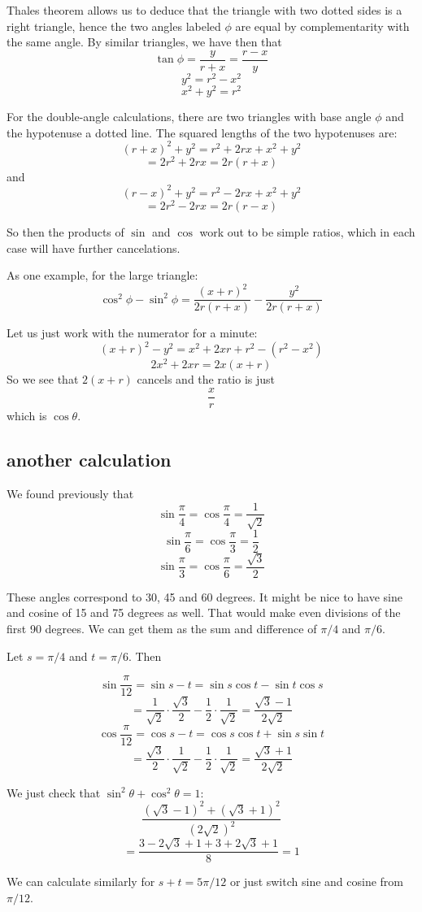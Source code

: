 \documentclass[11pt, oneside]{article}
\begin{document}
Thales theorem allows us to deduce that the triangle with two dotted sides is a right triangle, hence the two angles labeled $\phi$ are equal by complementarity with the same angle.  By similar triangles, we have then that
\[ \tan \phi = \frac{y}{r + x} = \frac{r - x}{y} \]
\[ y^2 = r^2 - x^2 \]
\[ x^2 + y^2 = r^2 \]

For the double-angle calculations, there are two triangles with base angle $\phi$ and the hypotenuse a dotted line.  The squared lengths of the two hypotenuses are:
\[ (r + x)^2 + y^2 = r^2 + 2rx + x^2 + y^2 \]
\[ = 2r^2 + 2rx = 2r(r + x) \]
and 
\[ (r - x)^2 + y^2 = r^2 - 2rx + x^2 + y^2 \]
\[ = 2r^2 - 2rx = 2r(r - x) \]

So then the products of $\sin$ and $\cos$ work out to be simple ratios, which in each case will have further cancelations.

As one example, for the large triangle:
\[ \cos^2 \phi - \sin^2 \phi = \frac{(x+r)^2}{2r(r + x)} - \frac{y^2}{2r(r + x)} \]

Let us just work with the numerator for a minute:
\[ (x+r)^2 - y^2 = x^2 + 2xr + r^2 - (r^2 - x^2) \]
\[ 2x^2 + 2xr = 2x(x + r) \]
So we see that $2(x+r)$ cancels and the ratio is just
\[ \frac{x}{r} \]
which is $\cos \theta$.

\subsection*{another calculation}
We found previously that 
\[ \sin \frac{\pi}{4} = \cos \frac{\pi}{4} = \frac{1}{\sqrt{2}} \]
\[ \sin \frac{\pi}{6} = \cos \frac{\pi}{3} = \frac{1}{2} \]
\[ \sin \frac{\pi}{3} = \cos \frac{\pi}{6} = \frac{\sqrt{3}}{2} \]

These angles correspond to 30, 45 and 60 degrees.  It might be nice to have sine and cosine of 15 and 75 degrees as well.  That would make even divisions of the first 90 degrees.  We can get them as the sum and difference of $\pi/4$ and $\pi/6$.

Let $s = \pi/4$ and $t = \pi/6$.  Then

\[ \sin \frac{\pi}{12} = \sin s - t = \sin s \cos t - \sin t \cos s \]
\[ = \frac{1}{\sqrt{2}} \cdot \frac{\sqrt{3}}{2} - \frac{1}{2} \cdot \frac{1}{\sqrt{2}} = \frac{\sqrt{3} - 1}{2 \sqrt{2}} \]
\[ \cos \frac{\pi}{12} = \cos s - t = \cos s \cos t + \sin s \sin t \]
\[ = \frac{\sqrt{3}}{2} \cdot \frac{1}{\sqrt{2}} - \frac{1}{2} \cdot \frac{1}{\sqrt{2}} = \frac{\sqrt{3} + 1}{2 \sqrt{2}} \]

We just check that $\sin^2 \theta + \cos^2 \theta = 1$:
\[ \frac{(\sqrt{3} - 1)^2 + (\sqrt{3} + 1)^2}{(2 \sqrt{2})^2} \]
\[ = \frac{3 - 2 \sqrt{3} + 1 + 3 + 2 \sqrt{3} + 1}{8} = 1 \]

We can calculate similarly for $s + t = 5 \pi/12$ or just switch sine and cosine from $\pi/12$.
\end{document}
